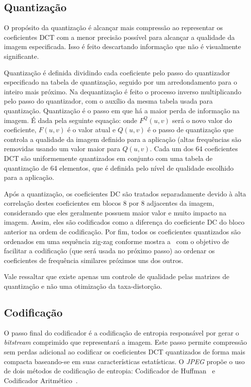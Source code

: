 \subsection{Quantização}
O propósito da quantização é alcançar mais compressão ao representar os coeficientes \acrshort{DCT} com a menor precisão possível para alcançar a qualidade da imagem especificada. Isso é feito descartando informação que não é visualmente significante.

Quantização é definida dividindo cada coeficiente pelo passo do quantizador especificado na tabela de quantização, seguido por um arredondamento para o inteiro mais próximo. Na dequantização é feito o processo inverso multiplicando pelo passo do quantizador, com o auxílio da mesma tabela usada para quantização. Quantização é o passo em que há a maior perda de informação na imagem. É dada pela seguinte equação:
onde $F^Q(u,v)$ será o novo valor do coeficiente, $F(u,v)$  é o valor atual e $Q(u,v)$ é o passo de quantização que controla a qualidade da imagem definido para a aplicação (altas frequências são removidas usando um valor maior para $Q(u,v)$. Cada um dos 64 coeficientes \acrshort{DCT} são uniformemente quantizados em conjunto com uma tabela de quantização de 64 elementos, que é definida pelo nível de qualidade escolhido para a aplicação.

Após a quantização, os coeficientes \acrshort{DC} são tratados separadamente devido à alta correlação destes coeficientes em blocos 8 por 8 adjacentes da imagem, considerando que eles geralmente possuem maior valor e muito impacto na imagem. Assim, eles são codificados como a diferença do coeficiente \acrshort{DC} do bloco anterior na ordem de codificação. Por fim, todos os coeficientes quantizados são ordenados em uma sequência zig-zag conforme mostra a~ com o objetivo de facilitar a codificação (que será usada no próximo passo) ao ordenar os coeficientes de frequência similares próximos uns dos outros.

Vale ressaltar que existe apenas um controle de qualidade pelas matrizes de quantização e não uma otimização da taxa-distorção.
\subsection{Codificação}
O passo final do codificador é a codificação de entropia responsável por gerar o \textit{bitstream} comprimido que representará a imagem. Este passo permite compressão sem perdas adicional ao codificar os coeficientes \acrshort{DCT} quantizados de forma mais compacta baseando-se em suas características estatísticas. O \textit{JPEG} propõe o uso de dois métodos de codificação de entropia: Codificador de Huffman~\cite{huffman1952method} e Codificador Aritmético~\cite{pennebaker1988arithmetic}. 

